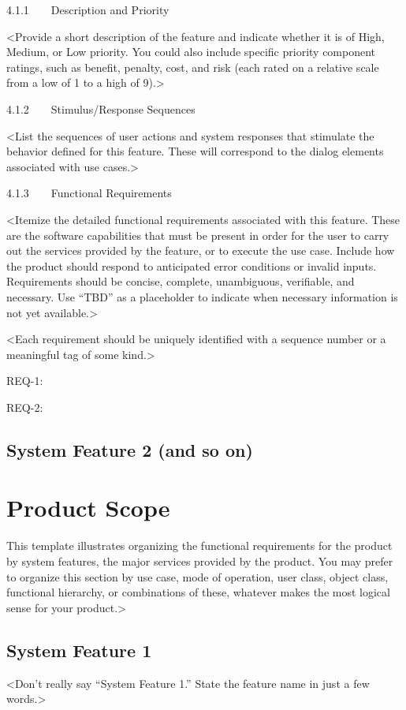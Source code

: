 \documentclass{scrreprt}
\begin{document}
4.1.1    Description and Priority

<Provide a short description of the feature and indicate whether it is of High, Medium, or Low priority. You could also include specific priority component ratings, such as benefit, penalty, cost, and risk (each rated on a relative scale from a low of 1 to a high of 9).>

4.1.2    Stimulus/Response Sequences

<List the sequences of user actions and system responses that stimulate the behavior defined for this feature. These will correspond to the dialog elements associated with use cases.>

4.1.3    Functional Requirements

<Itemize the detailed functional requirements associated with this feature. These are the software capabilities that must be present in order for the user to carry out the services provided by the feature, or to execute the use case. Include how the product should respond to anticipated error conditions or invalid inputs. Requirements should be concise, complete, unambiguous, verifiable, and necessary. Use “TBD” as a placeholder to indicate when necessary information is not yet available.>

<Each requirement should be uniquely identified with a sequence number or a meaningful tag of some kind.>

REQ-1:

REQ-2:

\subsection*{System Feature 2 (and so on)}
    \section{Product Scope}
    This template illustrates organizing the functional requirements for the product by system features, the major services provided by the product. You may prefer to organize this section by use case, mode of operation, user class, object class, functional hierarchy, or combinations of these, whatever makes the most logical sense for your product.>

\subsection*{System Feature 1}

<Don’t really say “System Feature 1.” State the feature name in just a few words.>
\end{document}
